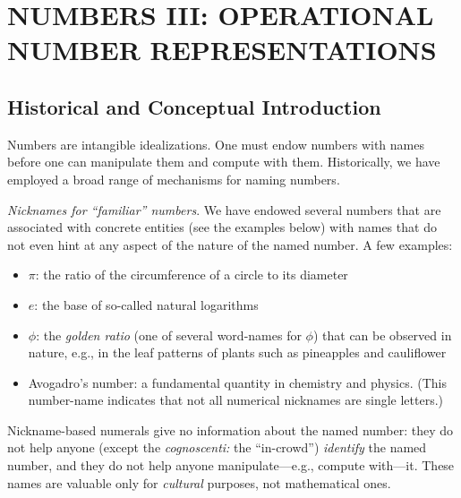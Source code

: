 
\chapter{NUMBERS III: OPERATIONAL NUMBER REPRESENTATIONS}
\label{ch:numerals}

\section{Historical and Conceptual Introduction}

Numbers are intangible idealizations.  One must endow numbers with
names before one can manipulate them and compute with them.
Historically, we have employed a broad range of mechanisms for naming
numbers.

{}
{}
{}

\medskip

\noindent
{\it Nicknames for ``familiar'' numbers}.
%
We have endowed several numbers that are associated with concrete
entities (see the examples below) with names that do not even hint at
any aspect of the nature of the named number.  A few examples:
\begin{itemize}
\item
$\pi$: the ratio of the circumference of a circle to its diameter
\item
$e$: the base of so-called natural logarithms
\item
$\phi$: the {\it golden ratio} (one of several word-names for $\phi$)
  that can be observed in nature, e.g., in the leaf patterns of plants
  such as pineapples and cauliflower
\item
Avogadro's number: a fundamental quantity in chemistry and physics.
(This number-name indicates that not all numerical nicknames are
single letters.)
\end{itemize}
Nickname-based numerals give no information about the named number:
they do not help anyone (except the {\it cognoscenti:} the
``in-crowd'') {\em identify} the named number, and they do not help
anyone manipulate---e.g., compute with---it.  These names are valuable
only for {\em cultural} purposes, not mathematical ones.

